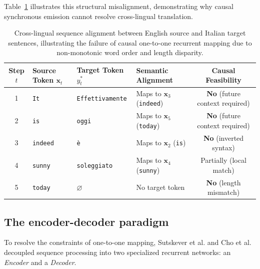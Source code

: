 \documentclass[../../main.tex]{subfiles}
\begin{document}
Table~\ref{tab:rnn_translation_alignment} illustrates this structural misalignment, demonstrating why causal synchronous emission cannot resolve cross-lingual translation.

\begin{table}[htbp]
\centering
\small
\begin{tabularx}{\textwidth}{c l l X c}
\toprule
\textbf{Step $t$} & \textbf{Source Token $\mathbf{x}_t$} & \textbf{Target Token $y_t^*$} & \textbf{Semantic Alignment} & \textbf{Causal Feasibility} \\
\midrule
1 & \texttt{It} & \texttt{Effettivamente} & Maps to $\mathbf{x}_3$ (\texttt{indeed}) & \textbf{No} (future context required) \\
2 & \texttt{is} & \texttt{oggi} & Maps to $\mathbf{x}_5$ (\texttt{today}) & \textbf{No} (future context required) \\
3 & \texttt{indeed} & \texttt{è} & Maps to $\mathbf{x}_2$ (\texttt{is}) & \textbf{No} (inverted syntax) \\
4 & \texttt{sunny} & \texttt{soleggiato} & Maps to $\mathbf{x}_4$ (\texttt{sunny}) & Partially (local match) \\
5 & \texttt{today} & $\varnothing$ & No target token & \textbf{No} (length mismatch) \\
\bottomrule
\end{tabularx}
\caption{Cross-lingual sequence alignment between English source and Italian target sentences, illustrating the failure of causal one-to-one recurrent mapping due to non-monotonic word order and length disparity.}
\label{tab:rnn_translation_alignment}
\end{table}

\subsection{The encoder-decoder paradigm}
\label{subsec:rnn_encoder_decoder_paradigm}

To resolve the constraints of one-to-one mapping, Sutskever et al. \citep{sutskever2014} and Cho et al. \citep{cho2014} decoupled sequence processing into two specialized recurrent networks: an \textit{Encoder} and a \textit{Decoder}.
\end{document}
